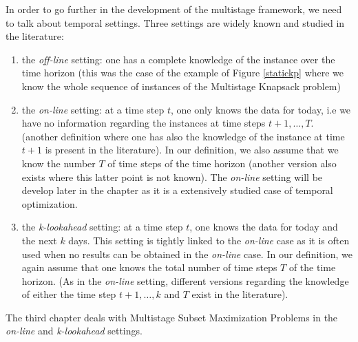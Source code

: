 \documentclass[a4paper]{book}
\begin{document}
In order to go further in the development of the multistage framework, we need to talk about temporal settings. Three settings are widely known and studied in the literature:
\begin{enumerate}
    \item the \emph{off-line} setting: one has a complete knowledge of the instance over the time horizon (this was the case of the example of Figure \ref{statickp} where we know the whole sequence of instances of the {\sc Multistage Knapsack} problem)
    \item the \emph{on-line} setting: at a time step $t$, one only knows the data for today, i.e we have no information regarding the instances at time steps $t+1,\ldots,T$. (another definition where one has also the knowledge of the instance at time $t+1$ is present in the literature). In our definition, we also assume that we know the number $T$ of time steps of the time horizon (another version also exists where this latter point is not known). The \emph{on-line} setting will be develop later in the chapter as it is a extensively studied case of temporal optimization.
    \item the \emph{k-lookahead} setting: at a time step $t$, one knows the data for today and the next $k$ days. This setting is tightly linked to the \emph{on-line} case as it is often used when no results can be obtained in the \emph{on-line} case. In our definition, we again assume that one knows the total number of time steps $T$ of the time horizon. (As in the \emph{on-line} setting, different versions regarding the knowledge of either the time step $t+1,\ldots,k$ and $T$ exist in the literature).
\end{enumerate}

The third chapter deals with Multistage Subset Maximization Problems in the \emph{on-line} and \emph{k-lookahead} settings. \\
\end{document}
